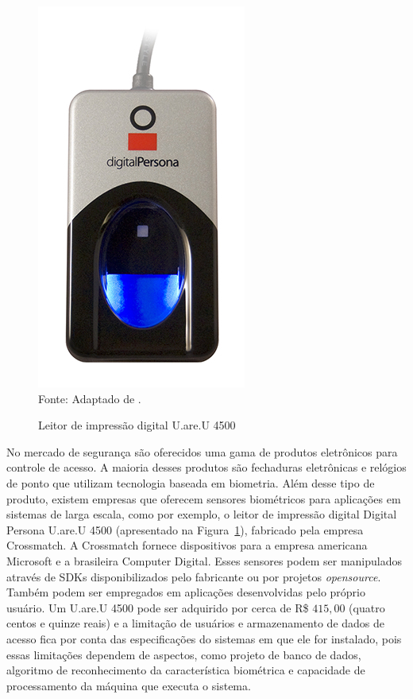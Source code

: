   
  \begin{figure}[!ht]
  \begin{center}
  \caption{Leitor de impressão digital U.are.U 4500}
  \includegraphics[scale=0.4]{figuras/cap3/uareu4500digitalpersona.jpg}\\
  Fonte: Adaptado de \cite{uareu4500digitalpersona}.
  \label{uareu4500digitalpersona}
  \end{center}
  \end{figure}
  
  
  No mercado de segurança são oferecidos uma gama de produtos eletrônicos para controle de acesso. A maioria desses produtos são fechaduras eletrônicas e relógios de ponto que utilizam tecnologia baseada em biometria. Além desse tipo de produto, existem empresas que oferecem sensores biométricos para aplicações em sistemas de larga escala, como por exemplo, o leitor de impressão digital Digital Persona U.are.U 4500\cite{uareu4500digitalpersona} (apresentado na Figura~\ref{uareu4500digitalpersona}), fabricado pela empresa Crossmatch. A Crossmatch fornece dispositivos para a empresa americana Microsoft e a brasileira Computer Digital. Esses sensores podem ser manipulados através de SDKs disponibilizados pelo fabricante ou por projetos \textit{opensource}. Também podem ser empregados em aplicações desenvolvidas pelo próprio usuário. 
  Um U.are.U 4500 pode ser adquirido por cerca de R{\$} $415,00$ (quatro centos e quinze reais) e a limitação de usuários e armazenamento de dados de acesso fica por conta das especificações do sistemas em que ele for instalado, pois essas limitações dependem de aspectos, como projeto de banco de dados, algoritmo de reconhecimento da característica biométrica e capacidade de processamento da máquina que executa o sistema.

